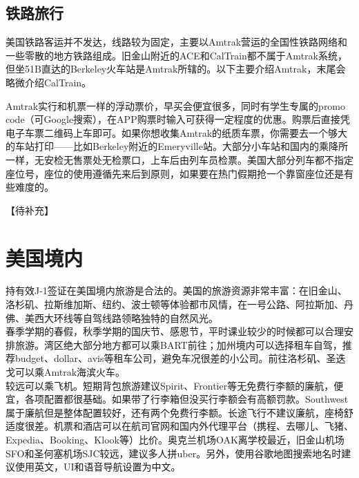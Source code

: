 \subsection{铁路旅行}
美国铁路客运并不发达，线路较为固定，主要以Amtrak营运的全国性铁路网络和一些零散的地方铁路组成。旧金山附近的ACE和CalTrain都不属于Amtrak系统，但坐51B直达的Berkeley火车站是Amtrak所辖的。以下主要介绍Amtrak，末尾会略微介绍CalTrain。

Amtrak实行和机票一样的浮动票价，早买会便宜很多，同时有学生专属的promo code（可Google搜索），在APP购票时输入可获得一定程度的优惠。购票后直接凭电子车票二维码上车即可。如果你想收集Amtrak的纸质车票，你需要去一个够大的车站打印——比如Berkeley附近的Emeryville站。大部分小车站和国内的乘降所一样，无安检无售票处无检票口，上车后由列车员检票。美国大部分列车都不指定座位号，座位的使用遵循先来后到原则，如果要在热门假期抢一个靠窗座位还是有些难度的。

【待补充】


\section{美国境内}
持有效J-1签证在美国境内旅游是合法的。美国的旅游资源非常丰富：在旧金山、洛杉矶、拉斯维加斯、纽约、波士顿等体验都市风情，在一号公路、阿拉斯加、丹佛、美西大环线等自驾线路领略独特的自然风光。\\ \indent 春季学期的春假，秋季学期的国庆节、感恩节，平时课业较少的时候都可以合理安排旅游。湾区绝大部分地方都可以乘BART前往；加州境内可以选择租车自驾，推荐budget、dollar、avis等租车公司，避免车况很差的小公司。前往洛杉矶、圣迭戈可以乘Amtrak海滨火车。\\ \indent 较远可以乘飞机。短期背包旅游建议Spirit、Frontier等无免费行李额的廉航，便宜，各项配置都很基础。如果带了行李箱但没买行李额会有高额罚款。Southwest属于廉航但是整体配置较好，还有两个免费行李额。长途飞行不建议廉航，座椅舒适度很差。机票和酒店可以在航司官网和国内外代理平台（携程、去哪儿、飞猪、Expedia、Booking、Klook等）比价。奥克兰机场OAK离学校最近，旧金山机场SFO和圣何塞机场SJC较远，建议多人拼uber。另外，使用谷歌地图搜索地名时建议使用英文，UI和语音导航设置为中文。



